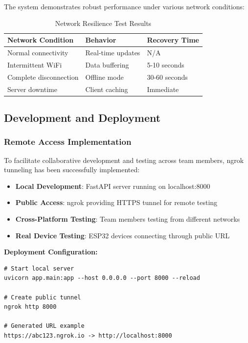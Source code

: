 \documentclass[12pt,a4paper]{article}
\begin{document}
The system demonstrates robust performance under various network conditions:

\begin{table}[H]
\centering
\begin{tabular}{|l|l|l|}
\hline
\textbf{Network Condition} & \textbf{Behavior} & \textbf{Recovery Time} \\
\hline
Normal connectivity & Real-time updates & N/A \\
Intermittent WiFi & Data buffering & 5-10 seconds \\
Complete disconnection & Offline mode & 30-60 seconds \\
Server downtime & Client caching & Immediate \\
\hline
\end{tabular}
\caption{Network Resilience Test Results}
\label{tab:network_resilience}
\end{table}

\subsection{Development and Deployment}

\subsubsection{Remote Access Implementation}

To facilitate collaborative development and testing across team members, ngrok tunneling has been successfully implemented:

\begin{itemize}
    \item \textbf{Local Development}: FastAPI server running on localhost:8000
    \item \textbf{Public Access}: ngrok providing HTTPS tunnel for remote testing
    \item \textbf{Cross-Platform Testing}: Team members testing from different networks
    \item \textbf{Real Device Testing}: ESP32 devices connecting through public URL
\end{itemize}

\textbf{Deployment Configuration:}
\begin{lstlisting}[caption=ngrok Tunnel Configuration]
# Start local server
uvicorn app.main:app --host 0.0.0.0 --port 8000 --reload

# Create public tunnel
ngrok http 8000

# Generated URL example
https://abc123.ngrok.io -> http://localhost:8000
\end{lstlisting}
\end{document}
